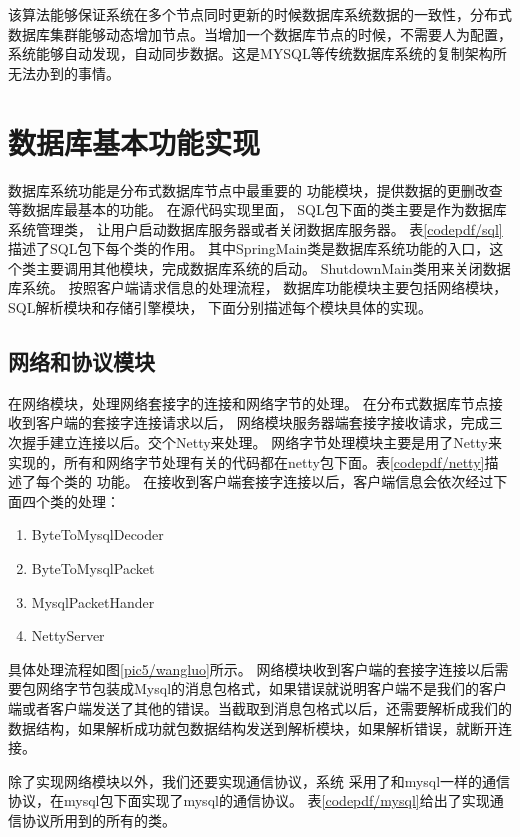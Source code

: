 该算法能够保证系统在多个节点同时更新的时候数据库系统数据的一致性，分布式数据库集群能够动态增加节点。当增加一个数据库节点的时候，不需要人为配置，系统能够自动发现，自动同步数据。这是MYSQL等传统数据库系统的复制架构所无法办到的事情。
\section{数据库基本功能实现}
数据库系统功能是分布式数据库节点中最重要的
功能模块，提供数据的更删改查等数据库最基本的功能。
在源代码实现里面，
SQL包下面的类主要是作为数据库系统管理类，
让用户启动数据库服务器或者关闭数据库服务器。
表\ref{codepdf/sql}描述了SQL包下每个类的作用。
其中SpringMain类是数据库系统功能的入口，这个类主要调用其他模块，完成数据库系统的启动。
ShutdownMain类用来关闭数据库系统。
按照客户端请求信息的处理流程，
数据库功能模块主要包括网络模块，SQL解析模块和存储引擎模块，
下面分别描述每个模块具体的实现。
\subsection{网络和协议模块}
在网络模块，处理网络套接字的连接和网络字节的处理。
在分布式数据库节点接收到客户端的套接字连接请求以后，
网络模块服务器端套接字接收请求，完成三次握手建立连接以后。交个Netty来处理。
网络字节处理模块主要是用了Netty来实现的，所有和网络字节处理有关的代码都在netty包下面。表\ref{codepdf/netty}描述了每个类的
功能。
在接收到客户端套接字连接以后，客户端信息会依次经过下面四个类的处理：
\begin{enumerate}
	\item ByteToMysqlDecoder
	\item ByteToMysqlPacket
	\item MysqlPacketHander
	\item NettyServer
\end{enumerate}
具体处理流程如图\ref{pic5/wangluo}所示。
网络模块收到客户端的套接字连接以后需要包网络字节包装成Mysql的消息包格式，如果错误就说明客户端不是我们的客户端或者客户端发送了其他的错误。当截取到消息包格式以后，还需要解析成我们的数据结构，如果解析成功就包数据结构发送到解析模块，如果解析错误，就断开连接。

除了实现网络模块以外，我们还要实现通信协议，系统
采用了和mysql一样的通信协议，在mysql包下面实现了mysql的通信协议。
表\ref{codepdf/mysql}给出了实现通信协议所用到的所有的类。

